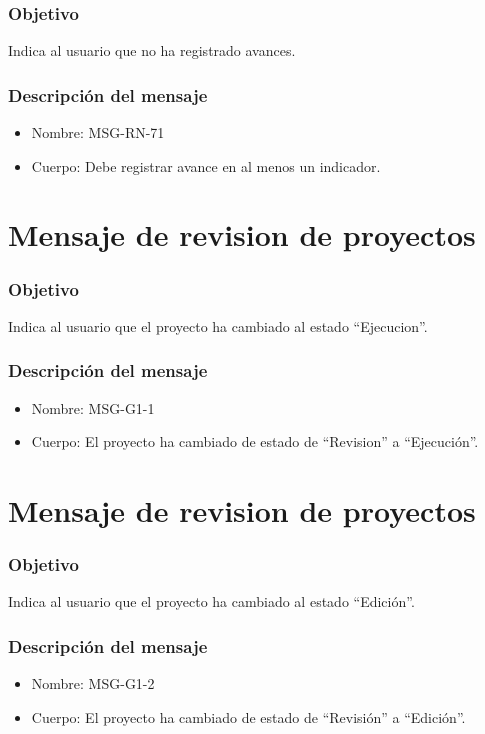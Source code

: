 \subsubsection{Objetivo}
Indica al usuario que no ha registrado avances.

\subsubsection{Descripción del mensaje}
\begin{itemize}
\item Nombre: MSG-RN-71
\item Cuerpo: Debe registrar avance en al menos un indicador.
\end{itemize}


\section{Mensaje de revision de proyectos} \label{MSGg11}

\subsubsection{Objetivo}
Indica al usuario que el proyecto ha cambiado al estado ``Ejecucion''.

\subsubsection{Descripción del mensaje}
\begin{itemize}
\item Nombre: MSG-G1-1
\item Cuerpo: El proyecto ha cambiado de estado de ``Revision'' a ``Ejecución''.
\end{itemize}

\section{Mensaje de revision de proyectos} \label{MSGg12}

\subsubsection{Objetivo}
Indica al usuario que el proyecto ha cambiado al estado ``Edición''.

\subsubsection{Descripción del mensaje}
\begin{itemize}
\item Nombre: MSG-G1-2
\item Cuerpo: El proyecto ha cambiado de estado de ``Revisión'' a ``Edición''.
\end{itemize}





